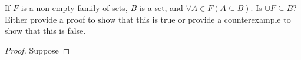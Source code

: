 
\begin{theorem}
  If $F$ is a non-empty family of sets, $B$ is a set, and $\forall A \in F (A
  \subseteq B)$. Is $\cup F \subseteq B$? Either provide a proof to show
  that this is true or provide a counterexample to show that this is false.
\end{theorem}

\begin{proof}
  Suppose
\end{proof}



\begin{align*}
\end{align*}
